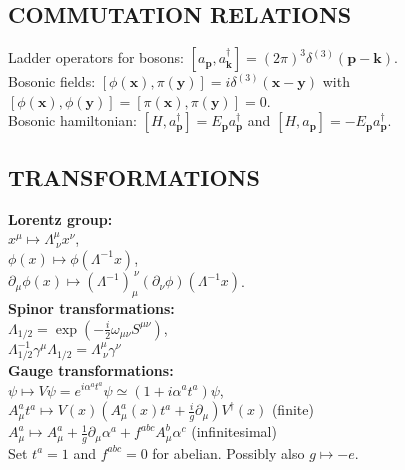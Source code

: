 \documentclass[a4paper, norsk, 8pt, landscape]{article}
\begin{document}
\begin{multicols*}{3}
\subsection*{\footnotesize  COMMUTATION RELATIONS}
Ladder operators for bosons:
$[a_\mathbf{p},a_\mathbf{k}^\dagger]=(2\pi)^3 \delta^{(3)}(\mathbf{p}-\mathbf{k})$.
\\
Bosonic fields:
$[\phi(\mathbf{x}),\pi(\mathbf{y})]=i\delta^{(3)}(\mathbf{x}-\mathbf{y})$ with
$[\phi(\mathbf{x}),\phi(\mathbf{y})]
=[\pi(\mathbf{x}),\pi(\mathbf{y})]=0$. \\
Bosonic hamiltonian:
$[H,a^\dagger_\mathbf{p}] = E_\mathbf{p}a_\mathbf{p}^\dagger$
and
$[H,a_\mathbf{p}] = -E_\mathbf{p}a_\mathbf{p}^\dagger$.













\subsection*{\footnotesize  TRANSFORMATIONS}
\textbf{Lorentz group:} \\
$ x^\mu \mapsto \Lambda^\mu_{\ \nu} x^\nu$,\\
$\phi(x) \mapsto \phi(\Lambda^{-1}x)$, \\
$\partial_\mu \phi(x) \mapsto (\Lambda^{-1})_\mu^{\ \nu}(\partial_\nu \phi)(\Lambda^{-1}x)$.
\\
\textbf{Spinor transformations:} \\
$\Lambda_{1/2}=\exp\left(-\frac{i}{2}\omega_{\mu\nu}S^{\mu\nu}\right)$, \\
$\Lambda^{-1}_{1/2}\gamma^\mu \Lambda_{1/2} = \Lambda^\mu_{\ \nu} \gamma^\nu$
\\
\textbf{Gauge transformations:} \\
$\psi \mapsto V\psi = e^{i\alpha^a t^a}\psi \simeq (1+i\alpha^a t^a) \psi$, \\
$A_\mu^a t^a \mapsto V(x) \left( A_\mu^a(x)t^a + \frac{i}{g}\partial_\mu \right)V^\dagger(x)$ (finite) \\
$A_\mu^a \mapsto A_\mu^a + \frac{1}{g}\partial_\mu  \alpha^a +f^{abc}A_\mu^b \alpha^c$ (infinitesimal) \\
Set $t^a = 1$ and $f^{abc}=0$ for abelian. Possibly also $g \mapsto -e$.








\end{multicols*}
\end{document}
